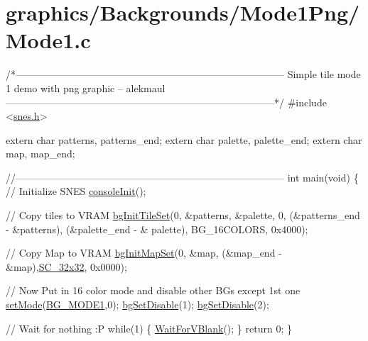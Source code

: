 \hypertarget{a00364}{}\section{graphics/\+Backgrounds/\+Mode1\+Png/\+Mode1.\+c}

\begin{DoxyCodeInclude}
\textcolor{comment}{/*---------------------------------------------------------------------------------}
\textcolor{comment}{}
\textcolor{comment}{}
\textcolor{comment}{    Simple tile mode 1 demo with png graphic}
\textcolor{comment}{    -- alekmaul}
\textcolor{comment}{}
\textcolor{comment}{}
\textcolor{comment}{---------------------------------------------------------------------------------*/}
\textcolor{preprocessor}{#include <\hyperlink{a00326}{snes.h}>}

\textcolor{keyword}{extern} \textcolor{keywordtype}{char} patterns, patterns\_end;
\textcolor{keyword}{extern} \textcolor{keywordtype}{char} palette, palette\_end;
\textcolor{keyword}{extern} \textcolor{keywordtype}{char} map, map\_end;

\textcolor{comment}{//---------------------------------------------------------------------------------}
\textcolor{keywordtype}{int} main(\textcolor{keywordtype}{void}) \{
    \textcolor{comment}{// Initialize SNES }
    \hyperlink{a00290_a6047713bb5a73afd3cd1d77e336bcdad}{consoleInit}();
     
    \textcolor{comment}{// Copy tiles to VRAM}
    \hyperlink{a00287_ae09a7ac09be78eef0f28a6c7aabc82ad}{bgInitTileSet}(0, &patterns, &palette, 0, (&patterns\_end - &patterns), (&palette\_end - &
      palette), BG\_16COLORS, 0x4000);

    \textcolor{comment}{// Copy Map to VRAM}
    \hyperlink{a00287_acc385296e159449a81d18f5e219c8032}{bgInitMapSet}(0, &map, (&map\_end - &map),\hyperlink{a00287_a11724b6748ce0954e9b43819263537fc}{SC\_32x32}, 0x0000);

    \textcolor{comment}{// Now Put in 16 color mode and disable other BGs except 1st one}
    \hyperlink{a00323_afd9e46ae627d055dd8c98a4b0ebb73b1}{setMode}(\hyperlink{a00287_a05c862edb7f8f75036f10c04dcc3c2a6}{BG\_MODE1},0);  \hyperlink{a00287_a4dbfb1b8854ff9ca4a7d11a899281bbb}{bgSetDisable}(1); 
      \hyperlink{a00287_a4dbfb1b8854ff9ca4a7d11a899281bbb}{bgSetDisable}(2);
    
    \textcolor{comment}{// Wait for nothing :P}
    \textcolor{keywordflow}{while}(1) \{
        \hyperlink{a00296_a815e2626bd26d0e936d507a363ecd723}{WaitForVBlank}();
    \}
    \textcolor{keywordflow}{return} 0;
\}
\end{DoxyCodeInclude}
 